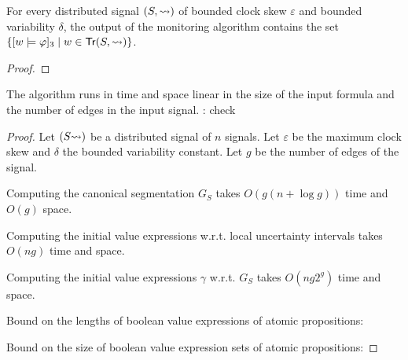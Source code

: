 \begin{claim}
	For every distributed signal $(S, {\rightsquigarrow})$ of bounded clock skew $\varepsilon$ and bounded variability $\delta$, the output of the monitoring algorithm contains the set $\{ [w \models \varphi]_3 \st w \in \tr(S, {\hb}) \}$.
\end{claim}
\begin{proof}
	\TODO
\end{proof}

\begin{claim}
	The algorithm runs in time and space linear in the size of the input formula and the number of edges in the input signal. \TODO: check
\end{claim}
\begin{proof}
	\TODO %
	
	Let $(S {\rightsquigarrow})$ be a distributed signal of $n$ signals.
	Let $\varepsilon$ be the maximum clock skew and $\delta$ the bounded variability constant.
	Let $g$ be the number of edges of the signal.
	
	Computing the canonical segmentation $G_S$ takes $O(g (n + \log g))$ time and $O(g)$ space.
	
	Computing the initial value expressions w.r.t. local uncertainty intervals takes $O(n g)$ time and space.
	
	Computing the initial value expressions $\gamma$ w.r.t. $G_S$ takes $O(n g 2^g)$ time and space.
	
	Bound on the lengths of boolean value expressions of atomic propositions:
	
	Bound on the size of boolean value expression sets of atomic propositions:
\end{proof}